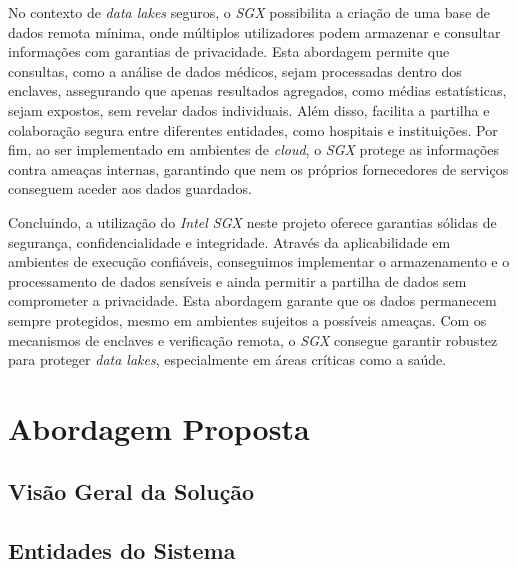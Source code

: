 \documentclass[a4paper,12pt]{article}
\begin{document}
No contexto de \textit{data lakes} seguros, o \textit{SGX} possibilita a criação de uma base de dados remota mínima, onde múltiplos utilizadores podem armazenar e consultar informações com garantias de privacidade. Esta abordagem permite que consultas, como a análise de dados médicos, sejam processadas dentro dos enclaves, assegurando que apenas resultados agregados, como médias estatísticas, sejam expostos, sem revelar dados individuais. Além disso, facilita a partilha e colaboração segura entre diferentes entidades, como hospitais e instituições. Por fim, ao ser implementado em ambientes de \textit{cloud}, o \textit{SGX} protege as informações contra ameaças internas, garantindo que nem os próprios fornecedores de serviços conseguem aceder aos dados guardados.

Concluindo, a utilização do \textit{Intel SGX} neste projeto oferece garantias sólidas de segurança, confidencialidade e integridade. Através da aplicabilidade em ambientes de execução confiáveis, conseguimos implementar o  armazenamento e o processamento de dados sensíveis e ainda permitir a partilha de dados sem comprometer a privacidade. Esta abordagem garante que os dados permanecem sempre protegidos, mesmo em ambientes sujeitos a possíveis ameaças. Com os mecanismos de enclaves e verificação remota, o \textit{SGX} consegue garantir robustez para proteger \textit{data lakes}, especialmente em áreas críticas como a saúde.

\section{Abordagem Proposta}

\subsection{Visão Geral da Solução}

\subsection{Entidades do Sistema}
\end{document}

